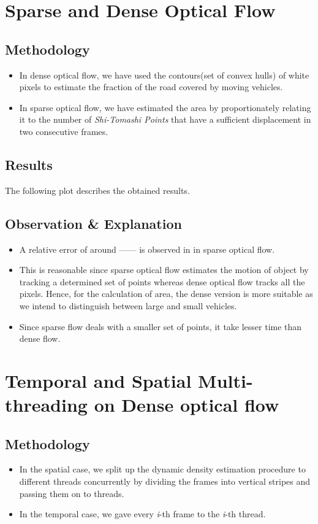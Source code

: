 \documentclass[a4paper]{article}
\begin{document}
\section*{Sparse and Dense Optical Flow}
\subsection*{Methodology}
\begin{itemize}
    \item In dense optical flow, we have used the contours(set of convex hulls) of white pixels to estimate the fraction of the road covered by moving vehicles.
    \item In sparse optical flow, we have estimated the area by proportionately relating it to the number of \textit{Shi-Tomashi Points} that have a sufficient displacement in two consecutive frames.
\end{itemize}
\subsection*{Results}
The following plot describes the obtained results.
\subsection*{Observation \& Explanation}
\begin{itemize}
    \item A relative error of around ------ is observed in in sparse optical flow. 
    \item  This is reasonable since sparse optical flow estimates the motion of object by tracking a determined set of points whereas dense optical flow tracks all the pixels. Hence, for the calculation of area, the dense version is more suitable as we intend to distinguish between large and small vehicles.
    \item Since sparse flow deals with a smaller set of points, it take lesser time than dense flow.
\end{itemize}
\section*{Temporal and Spatial Multi-threading on Dense optical flow}
\subsection*{Methodology}
\begin{itemize}
    \item In the spatial case, we split up the dynamic density estimation procedure to different threads concurrently by dividing the frames into vertical stripes and passing them on to threads.
    \item In the temporal case, we gave every \textit{i}-th frame to the \textit{i}-th thread. 
    
\end{itemize}
\end{document}
